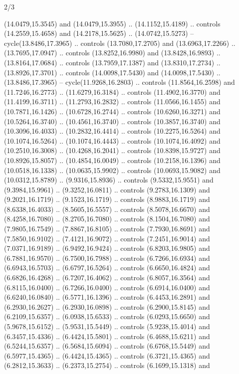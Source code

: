 \begin{flagdescription}{2/3}
\begin{scope}[yshift=\flagwidth,scale=\flagwidth/1241.93737]
\begin{scope}[y=-1mm, x=1mm,draw=gold,fill=blue,line join=miter,miter limit=4,line width=1.8\lw]
{  (14.0479,15.3545) and (14.0479,15.3955) .. (14.1152,15.4189) .. controls
  (14.2559,15.4658) and (14.2178,15.5625) .. (14.0742,15.5273) --
  cycle(13.8486,17.3965) .. controls (13.7080,17.2705) and (13.6963,17.2266) ..
  (13.7695,17.0947) .. controls (13.8252,16.9980) and (13.8428,16.9893) ..
  (13.8164,17.0684) .. controls (13.7959,17.1387) and (13.8310,17.2734) ..
  (13.8926,17.3701) .. controls (14.0098,17.5430) and (14.0098,17.5430) ..
  (13.8486,17.3965) -- cycle(11.9268,16.2803) .. controls (11.8564,16.2598) and
  (11.7246,16.2773) .. (11.6279,16.3184) .. controls (11.4902,16.3770) and
  (11.4199,16.3711) .. (11.2793,16.2832) .. controls (11.0566,16.1455) and
  (10.7871,16.1426) .. (10.6728,16.2744) .. controls (10.6260,16.3271) and
  (10.5264,16.3740) .. (10.4561,16.3740) .. controls (10.3857,16.3740) and
  (10.3096,16.4033) .. (10.2832,16.4414) .. controls (10.2275,16.5264) and
  (10.1074,16.5264) .. (10.1074,16.4443) .. controls (10.1074,16.4092) and
  (10.2510,16.3008) .. (10.4268,16.2041) .. controls (10.8398,15.9727) and
  (10.8926,15.8057) .. (10.4854,16.0049) .. controls (10.2158,16.1396) and
  (10.0518,16.1338) .. (10.0635,15.9902) .. controls (10.0693,15.9082) and
  (10.0312,15.8789) .. (9.9316,15.8936) .. controls (9.5332,15.9551) and
  (9.3984,15.9961) .. (9.3252,16.0811) .. controls (9.2783,16.1309) and
  (9.2021,16.1719) .. (9.1523,16.1719) .. controls (8.9883,16.1719) and
  (8.6338,16.4033) .. (8.5605,16.5557) .. controls (8.5078,16.6670) and
  (8.4258,16.7080) .. (8.2705,16.7080) .. controls (8.1504,16.7080) and
  (7.9805,16.7549) .. (7.8867,16.8105) .. controls (7.7930,16.8691) and
  (7.5850,16.9102) .. (7.4121,16.9072) .. controls (7.2451,16.9014) and
  (7.0371,16.9189) .. (6.9492,16.9424) .. controls (6.8203,16.9805) and
  (6.7881,16.9570) .. (6.7500,16.7988) .. controls (6.7266,16.6934) and
  (6.6943,16.5703) .. (6.6797,16.5264) .. controls (6.6650,16.4824) and
  (6.6826,16.4268) .. (6.7207,16.4062) .. controls (6.8057,16.3564) and
  (6.8115,16.0400) .. (6.7266,16.0400) .. controls (6.6914,16.0400) and
  (6.6240,16.0840) .. (6.5771,16.1396) .. controls (6.4453,16.2891) and
  (6.2930,16.2627) .. (6.2930,16.0898) .. controls (6.2900,15.8145) and
  (6.2109,15.6357) .. (6.0938,15.6533) .. controls (6.0293,15.6650) and
  (5.9678,15.6152) .. (5.9531,15.5449) .. controls (5.9238,15.4014) and
  (6.3457,15.4336) .. (6.4424,15.5801) .. controls (6.4688,15.6211) and
  (6.5244,15.6357) .. (6.5684,15.6094) .. controls (6.6768,15.5449) and
  (6.5977,15.4365) .. (6.4424,15.4365) .. controls (6.3721,15.4365) and
  (6.2812,15.3633) .. (6.2373,15.2754) .. controls (6.1699,15.1318) and
}
\end{scope}
\end{scope}
\end{flagdescription}
